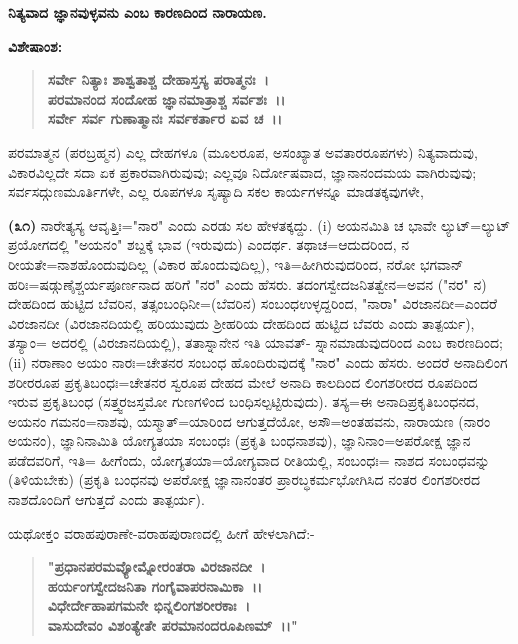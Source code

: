 \begin{center}
\textbf{ನಿತ್ಯವಾದ ಜ್ಞಾನವುಳ್ಳವನು ಎಂಬ ಕಾರಣದಿಂದ ನಾರಾಯಣ.}
\end{center}

\noindent
\textbf{ವಿಶೇಷಾಂಶ:\enginline{-}}

\begin{verse}
\textbf{ಸರ್ವೇ ನಿತ್ಯಾಃ ಶಾಶ್ವತಾಶ್ಚ ದೇಹಾಸ್ತಸ್ಯ ಪರಾತ್ಮನಃ~।}\\\textbf{ಪರಮಾನಂದ ಸಂದೋಹ ಜ್ಞಾನಮಾತ್ರಾಶ್ಚ ಸರ್ವಶಃ~।।}\\\textbf{ಸರ್ವೇ ಸರ್ವ ಗುಣಾತ್ಮಾನಃ ಸರ್ವಕರ್ತಾರ ಏವ ಚ~।।}
\end{verse}


ಪರಮಾತ್ಮನ (ಪರಬ್ರಹ್ಮನ) ಎಲ್ಲ ದೇಹಗಳೂ (ಮೂಲರೂಪ, ಅಸಂಖ್ಯಾತ ಅವತಾರರೂಪಗಳು) ನಿತ್ಯವಾದುವು, ವಿಕಾರವಿಲ್ಲದೇ ಸದಾ ಏಕ ಪ್ರಕಾರವಾಗಿರುವುವು; ಎಲ್ಲವೂ ನಿರ್ದೋಷವಾದ, ಜ್ಞಾನಾನಂದಮಯ ವಾಗಿರುವುವು; ಸರ್ವಸದ್ಗುಣಮೂರ್ತಿಗಳೇ, ಎಲ್ಲ ರೂಪಗಳೂ ಸೃಷ್ಯಾದಿ ಸಕಲ ಕಾರ್ಯಗಳನ್ನೂ ಮಾಡತಕ್ಕವುಗಳೇ,

\textbf{(೩೧)} ನಾರೇತ್ಯಸ್ಯ ಆವೃತ್ತಿಃ="ನಾರ" ಎಂದು ಎರಡು ಸಲ ಹೇಳತಕ್ಕದ್ದು. (i) ಅಯನಮಿತಿ ಚ ಭಾವೇ ಲ್ಯುಟ್=ಲ್ಯುಟ್ ಪ್ರಯೋಗದಲ್ಲಿ "ಅಯನಂ" ಶಬ್ದಕ್ಕೆ ಭಾವ (ಇರುವುದು) ಎಂದರ್ಥ. ತಥಾಚ=ಆದುದರಿಂದ, ನ ರೀಯತೇ=ನಾಶಹೊಂದುವುದಿಲ್ಲ (ವಿಕಾರ ಹೊಂದುವುದಿಲ್ಲ), ಇತಿ=ಹೀಗಿರುವುದರಿಂದ, ನರೋ ಭಗವಾನ್ ಹರಿಃ=ಷಡ್ಗುಣೈಶ್ಚರ್ಯಪೂರ್ಣನಾದ ಹರಿಗೆ "ನರ" ಎಂದು ಹೆಸರು. ತದಂಗಸ್ವೇದಜನಿತತ್ವೇನ=ಅವನ ("ನರ" ನ) ದೇಹದಿಂದ ಹುಟ್ಟಿದ ಬೆವರಿನ, ತತ್ಸಂಬಂಧಿನೀ=(ಬೆವರಿನ) ಸಂಬಂಧಉಳ್ಳದ್ದರಿಂದ, "ನಾರಾ" ವಿರಜಾನದೀ=ಎಂದರೆ ವಿರಜಾನದೀ (ವಿರಜಾನದಿಯಲ್ಲಿ ಹರಿಯುವುದು ಶ‍್ರೀಹರಿಯ ದೇಹದಿಂದ ಹುಟ್ಟಿದ ಬೆವರು ಎಂದು ತಾತ್ಪರ್ಯ), ತಸ್ಯಾಂ= ಅದರಲ್ಲಿ (ವಿರಜಾನದಿಯಲ್ಲಿ), ತತಾಸ್ನಾನೇನ ಇತಿ ಯಾವತ್- ಸ್ನಾನಮಾಡುವುದರಿಂದ ಎಂಬ ಕಾರಣದಿಂದ;\break (ii) ನರಾಣಾಂ ಅಯಂ ನಾರಃ=ಚೇತನರ ಸಂಬಂಧ ಹೊಂದಿರುವುದಕ್ಕೆ "ನಾರ" ಎಂದು ಹೆಸರು. ಅಂದರೆ ಅನಾದಿಲಿಂಗ ಶರೀರರೂಪ ಪ್ರಕೃತಿಬಂಧಃ=ಚೇತನರ ಸ್ವರೂಪ ದೇಹದ ಮೇಲೆ ಅನಾದಿ ಕಾಲದಿಂದ ಲಿಂಗಶರೀರದ ರೂಪದಿಂದ ಇರುವ ಪ್ರಕೃತಿಬಂಧ (ಸತ್ತ್ವ\-ರಜಸ್ತಮೋ ಗುಣಗಳಿಂದ ಬಂಧಿಸಲ್ಪಟ್ಟಿರುವುದು). ತಸ್ಯ=ಈ ಅನಾದಿಪ್ರಕೃತಿಬಂಧನದ, ಅಯನಂ ಗಮನಂ=ನಾಶವು, ಯಸ್ಮಾತ್=ಯಾರಿಂದ ಆಗುತ್ತದೆಯೋ, ಅಸೌ=ಅಂತಹವನು, ನಾರಾಯಣ (ನಾರಂ ಅಯನಂ), ಜ್ಞಾನಿನಾಮಿತಿ ಯೋಗ್ಯತಯಾ ಸಂಬಂಧಃ (ಪ್ರಕೃತಿ ಬಂಧನಾಶವು), ಜ್ಞಾನಿನಾಂ=ಅಪರೋಕ್ಷ ಜ್ಞಾನ ಪಡೆದವರಿಗೆ, ಇತಿ= ಹೀಗೆಂದು, ಯೋಗ್ಯತಯಾ=ಯೋಗ್ಯವಾದ ರೀತಿಯಲ್ಲಿ, ಸಂಬಂಧಃ= ನಾಶದ ಸಂಬಂಧವನ್ನು (ತಿಳಿಯಬೇಕು) (ಪ್ರಕೃತಿ ಬಂಧನವು ಅಪರೋಕ್ಷ ಜ್ಞಾನಾನಂತರ ಪ್ರಾರಬ್ಧಕರ್ಮಭೋಗಿಸಿದ ನಂತರ ಲಿಂಗಶರೀರದ ನಾಶದೊಂದಿಗೆ ಆಗುತ್ತದೆ ಎಂದು ತಾತ್ಪರ್ಯ).

ಯಥೋಕ್ತಂ ವರಾಹಪುರಾಣೇ-ವರಾಹಪುರಾಣದಲ್ಲಿ ಹೀಗೆ ಹೇಳಲಾಗಿದೆ:-

\begin{verse}
\textbf{"ಪ್ರಧಾನಪರಮವ್ಯೋಮ್ನೋರಂತರಾ ವಿರಜಾನದೀ~।}\\\textbf{ಹರ್ಯಂಗಸ್ವೇದಜನಿತಾ ಗಂಗೈವಾಪರನಾಮಿಕಾ~।।}\\\textbf{ವಿಧೇರ್ದೇಹಾಪಗಮನೇ ಭಿನ್ನಲಿಂಗಶರೀರಕಾಃ~।}\\\textbf{ವಾಸುದೇವಂ ವಿಶಂತ್ಯೇತೇ ಪರಮಾನಂದರೂಪಿಣಮ್~।।"}
\end{verse}

